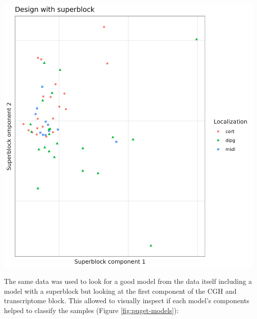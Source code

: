 \documentclass[
  a4paper,
]{book}
\let\origfigure\figure
\let\endorigfigure\endfigure
\renewenvironment{figure}[1][2] {
    \expandafter\origfigure\expandafter[!ht]
} {
    \endorigfigure
}
\begin{document}
\begin{figure}
\includegraphics[width=1\linewidth]{images/pugets_superblock} \caption[Superblock components on Puget's dataset]{First components of the superblock which has all the data of the samples on the Puget's dataset.}\label{fig:puget-superblock}
\end{figure}

The same data was used to look for a good model from the data itself including a model with a superblock but looking at the first component of the CGH and transcriptome block.
This allowed to visually inspect if each model's components helped to classify the samples (Figure \ref{fig:puget-models}):
\end{document}
